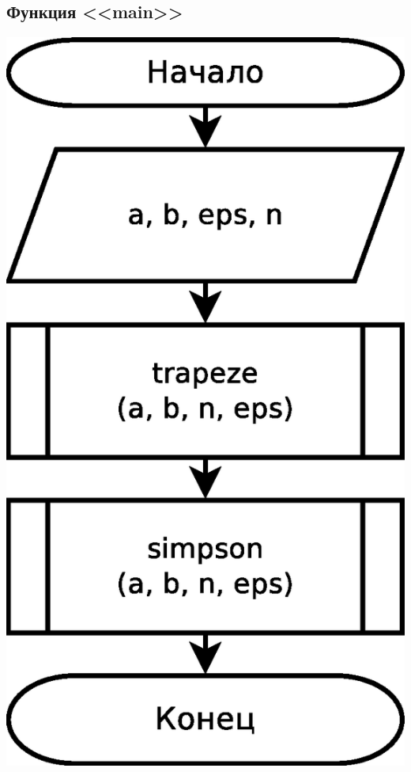 \documentclass[a4paper]{article}
\begin{document}
\subsection{Функция <<main>>}
\includegraphics[scale=0.35]{schemes/main}
\end{document}

